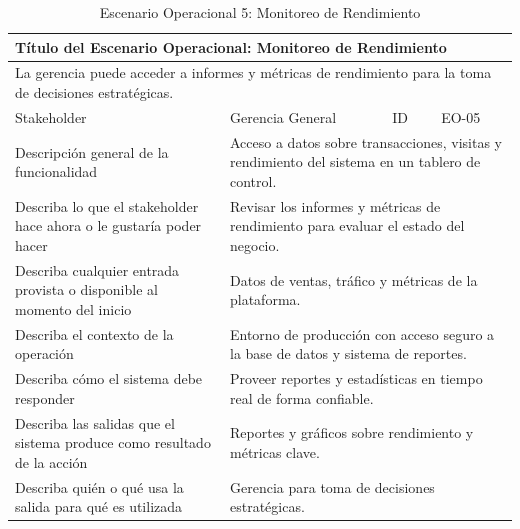 \documentclass[12pt]{article}
\begin{document}
\begin{table}[H]
    \centering
    \begin{tabular}{|p{4cm}|p{4cm}|p{4cm}|p{4cm}|}
        \hline
        \multicolumn{4}{|l|}{\cellcolor{teal!50}\textbf{Título del Escenario Operacional: Monitoreo de Rendimiento}} \\ \hline
        \multicolumn{4}{|p{16cm}|}{La gerencia puede acceder a informes y métricas de rendimiento para la toma de decisiones estratégicas.} \\ \hline
        \multicolumn{1}{|p{4cm}|}{\cellcolor{teal!50}Stakeholder} & \multicolumn{1}{p{6cm}|}{Gerencia General} & \multicolumn{1}{|p{2cm}|}{\cellcolor{teal!50}ID} & \multicolumn{1}{p{4cm}|}{EO-05} \\ \hline
        \multicolumn{1}{|p{4cm}|}{\cellcolor{teal!50}Descripción general de la funcionalidad} & \multicolumn{3}{p{12cm}|}{Acceso a datos sobre transacciones, visitas y rendimiento del sistema en un tablero de control.} \\ \hline
        \multicolumn{1}{|p{4cm}|}{\cellcolor{teal!50}Describa lo que el stakeholder hace ahora o le gustaría poder hacer} & \multicolumn{3}{p{12cm}|}{Revisar los informes y métricas de rendimiento para evaluar el estado del negocio.} \\ \hline
        \multicolumn{1}{|p{4cm}|}{\cellcolor{teal!50}Describa cualquier entrada provista o disponible al momento del inicio} & \multicolumn{3}{p{12cm}|}{Datos de ventas, tráfico y métricas de la plataforma.} \\ \hline
        \multicolumn{1}{|p{4cm}|}{\cellcolor{teal!50}Describa el contexto de la operación} & \multicolumn{3}{p{12cm}|}{Entorno de producción con acceso seguro a la base de datos y sistema de reportes.} \\ \hline
        \multicolumn{1}{|p{4cm}|}{\cellcolor{teal!50}Describa cómo el sistema debe responder} & \multicolumn{3}{p{12cm}|}{Proveer reportes y estadísticas en tiempo real de forma confiable.} \\ \hline
        \multicolumn{1}{|p{4cm}|}{\cellcolor{teal!50}Describa las salidas que el sistema produce como resultado de la acción} & \multicolumn{3}{p{12cm}|}{Reportes y gráficos sobre rendimiento y métricas clave.} \\ \hline
        \multicolumn{1}{|p{4cm}|}{\cellcolor{teal!50}Describa quién o qué usa la salida para qué es utilizada} & \multicolumn{3}{p{12cm}|}{Gerencia para toma de decisiones estratégicas.} \\ \hline
    \end{tabular}
    \caption{Escenario Operacional 5: Monitoreo de Rendimiento}
    \label{tab:escenario_operacional_5}
\end{table}
\end{document}
